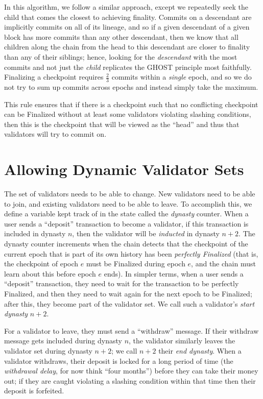 \documentclass[12pt]{article}
\newcommand{\epoch}{\ensuremath{e}\xspace}
\begin{document}
In this algorithm, we follow a similar approach, except we repeatedly seek the child that comes the closest to achieving finality. Commits on a descendant are implicitly commits on all of its lineage, and so if a given descendant of a given block has more commits than any other descendant, then we know that all children along the chain from the head to this descendant are closer to finality than any of their siblings; hence, looking for the \textit{descendant} with the most commits and not just the \textit{child} replicates the GHOST principle most faithfully. Finalizing a checkpoint requires $\frac{2}{3}$ commits within a \textit{single} epoch, and so we do not try to sum up commits across epochs and instead simply take the maximum.

This rule ensures that if there is a checkpoint such that no conflicting checkpoint can be Finalized without at least some validators violating slashing conditions, then this is the checkpoint that will be viewed as the ``head'' and thus that validators will try to commit on.

\section{Allowing Dynamic Validator Sets}
\label{sect:join_and_leave}

The set of validators needs to be able to change.  New validators need to be able to join, and existing validators need to be able to leave.  To accomplish this, we define a variable kept track of in the state called the \textit{dynasty} counter. When a user sends a ``deposit'' transaction to become a validator, if this transaction is included in dynasty $n$, then the validator will be \textit{inducted} in dynasty $n+2$. The dynasty counter increments when the chain detects that the checkpoint of the current epoch that is part of its own history has been \textit{perfectly Finalized} (that is, the checkpoint of epoch \epoch must be Finalized during epoch \epoch, and the chain must learn about this before epoch \epoch ends). In simpler terms, when a user sends a ``deposit'' transaction, they need to wait for the transaction to be perfectly Finalized, and then they need to wait again for the next epoch to be Finalized; after this, they become part of the validator set. We call such a validator's \textit{start dynasty} $n+2$.

For a validator to leave, they must send a ``withdraw'' message. If their withdraw message gets included during dynasty $n$, the validator similarly leaves the validator set during dynasty $n+2$; we call $n+2$ their \textit{end dynasty}. When a validator withdraws, their deposit is locked for a long period of time (the \textit{withdrawal delay}, for now think ``four months'') before they can take their money out; if they are caught violating a slashing condition within that time then their deposit is forfeited.
\end{document}
